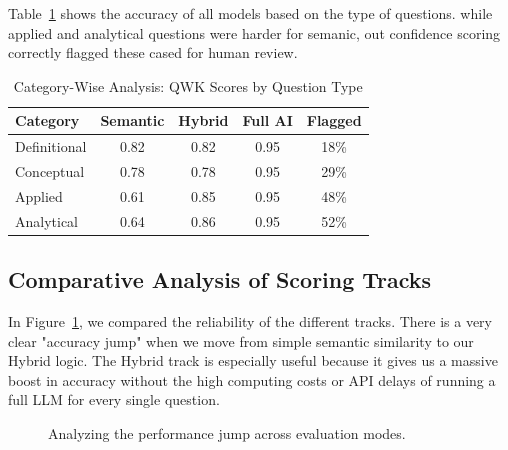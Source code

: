 \documentclass[conference]{IEEEtran}
\begin{document}
Table~\ref{tab:perquestion} shows the accuracy of all models based on the type of questions. while applied and analytical questions were harder for semanic, out confidence scoring correctly flagged these cased for human review.
\vspace{-1ex}
\begin{table}[H]
  \caption{Category-Wise Analysis: QWK Scores by Question Type}
  \label{tab:perquestion}
  \centering
  \begin{tabular}{lcccc}
    \toprule
    \textbf{Category} & \textbf{Semantic} & \textbf{Hybrid} & \textbf{Full AI} & \textbf{Flagged} \\
    \midrule
    Definitional & 0.82 & 0.82 & 0.95 & 18\% \\
    Conceptual   & 0.78 & 0.78 & 0.95 & 29\% \\
    Applied      & 0.61 & 0.85 & 0.95 & 48\% \\
    Analytical   & 0.64 & 0.86 & 0.95 & 52\% \\
    \bottomrule
  \end{tabular}
\end{table}
\vspace{-1ex}

\subsection{Comparative Analysis of Scoring Tracks}

In Figure~\ref{fig:accuracy_chart}, we compared the reliability of the different tracks. There is a very clear "accuracy jump" when we move from simple semantic similarity to our Hybrid logic. The Hybrid track is especially useful because it gives us a massive boost in accuracy without the high computing costs or API delays of running a full LLM for every single question.
\vspace{-1ex}
\begin{figure}[H]
\centering
{}
\caption{Analyzing the performance jump across evaluation modes.}
\label{fig:accuracy_chart}
\end{figure}
\vspace{-1ex}
\end{document}
